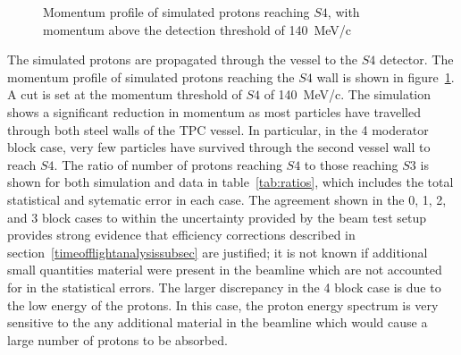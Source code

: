 \begin{figure}[ht]
  \centering
     \begin{adjustbox}{max totalsize={\textwidth}{.35\textheight}, center}
      
    \end{adjustbox}
    \caption{Momentum profile of simulated protons reaching $\mathit{S4}$, with momentum above the detection threshold of 140~MeV/c}
    \label{fig:MCS4}
\end{figure}



%      

The simulated protons are propagated through the vessel to the $\mathit{S4}$ detector.
The momentum profile of simulated protons reaching the $\mathit{S4}$ wall is shown in figure~\ref{fig:MCS4}.
A cut is set at the momentum threshold of $\mathit{S4}$ of 140~MeV/c.
The simulation shows a significant reduction in momentum as most particles have travelled through both steel walls of the TPC vessel.
In particular, in the 4 moderator block case, very few particles have survived through the second vessel wall to reach $\mathit{S4}$.
The ratio of number of protons reaching $\mathit{S4}$ to those reaching $\mathit{S3}$ is shown for both simulation and data in table~\ref{tab:ratios}, which includes the total statistical and sytematic error in each case.
The agreement shown in the 0, 1, 2, and 3 block cases to within the uncertainty provided by the beam test setup provides strong evidence that efficiency corrections described in section~\ref{timeofflightanalysissubsec} are justified; it is not known if additional small quantities material were present in the beamline which are not accounted for in the statistical errors.
The larger discrepancy in the 4 block case is due to the low energy of the protons.
In this case, the proton energy spectrum is very sensitive to the any additional material in the beamline which would cause a large number of protons to be absorbed.

